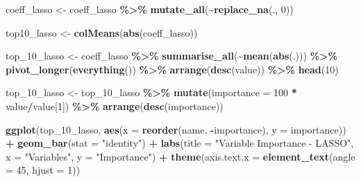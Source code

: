 \documentclass[
]{article}
\newenvironment{Shaded}{\begin{snugshade}}{\end{snugshade}}
\newcommand{\AttributeTok}[1]{\textcolor[rgb]{0.13,0.29,0.53}{#1}}
\newcommand{\DecValTok}[1]{\textcolor[rgb]{0.00,0.00,0.81}{#1}}
\newcommand{\FunctionTok}[1]{\textcolor[rgb]{0.13,0.29,0.53}{\textbf{#1}}}
\newcommand{\NormalTok}[1]{#1}
\newcommand{\OtherTok}[1]{\textcolor[rgb]{0.56,0.35,0.01}{#1}}
\newcommand{\SpecialCharTok}[1]{\textcolor[rgb]{0.81,0.36,0.00}{\textbf{#1}}}
\newcommand{\StringTok}[1]{\textcolor[rgb]{0.31,0.60,0.02}{#1}}
\begin{document}
\begin{Shaded}
\begin{Highlighting}[]
\NormalTok{coeff\_lasso }\OtherTok{\textless{}{-}}\NormalTok{ coeff\_lasso }\SpecialCharTok{\%\textgreater{}\%}
    \FunctionTok{mutate\_all}\NormalTok{(}\SpecialCharTok{\textasciitilde{}}\FunctionTok{replace\_na}\NormalTok{(., }\DecValTok{0}\NormalTok{))}

\NormalTok{top10\_lasso }\OtherTok{\textless{}{-}} \FunctionTok{colMeans}\NormalTok{(}\FunctionTok{abs}\NormalTok{(coeff\_lasso))}

\NormalTok{top\_10\_lasso }\OtherTok{\textless{}{-}}\NormalTok{ coeff\_lasso }\SpecialCharTok{\%\textgreater{}\%}
    \FunctionTok{summarise\_all}\NormalTok{(}\SpecialCharTok{\textasciitilde{}}\FunctionTok{mean}\NormalTok{(}\FunctionTok{abs}\NormalTok{(.))) }\SpecialCharTok{\%\textgreater{}\%}
    \FunctionTok{pivot\_longer}\NormalTok{(}\FunctionTok{everything}\NormalTok{()) }\SpecialCharTok{\%\textgreater{}\%}
    \FunctionTok{arrange}\NormalTok{(}\FunctionTok{desc}\NormalTok{(value)) }\SpecialCharTok{\%\textgreater{}\%}
    \FunctionTok{head}\NormalTok{(}\DecValTok{10}\NormalTok{)}

\NormalTok{top\_10\_lasso }\OtherTok{\textless{}{-}}\NormalTok{ top\_10\_lasso }\SpecialCharTok{\%\textgreater{}\%}
    \FunctionTok{mutate}\NormalTok{(}\AttributeTok{importance =} \DecValTok{100} \SpecialCharTok{*}\NormalTok{ value}\SpecialCharTok{/}\NormalTok{value[}\DecValTok{1}\NormalTok{]) }\SpecialCharTok{\%\textgreater{}\%}
    \FunctionTok{arrange}\NormalTok{(}\FunctionTok{desc}\NormalTok{(importance))}

\FunctionTok{ggplot}\NormalTok{(top\_10\_lasso, }\FunctionTok{aes}\NormalTok{(}\AttributeTok{x =} \FunctionTok{reorder}\NormalTok{(name, }\SpecialCharTok{{-}}\NormalTok{importance), }\AttributeTok{y =}\NormalTok{ importance)) }\SpecialCharTok{+}
    \FunctionTok{geom\_bar}\NormalTok{(}\AttributeTok{stat =} \StringTok{"identity"}\NormalTok{) }\SpecialCharTok{+} \FunctionTok{labs}\NormalTok{(}\AttributeTok{title =} \StringTok{"Variable Importance {-} LASSO"}\NormalTok{,}
    \AttributeTok{x =} \StringTok{"Variables"}\NormalTok{, }\AttributeTok{y =} \StringTok{"Importance"}\NormalTok{) }\SpecialCharTok{+} \FunctionTok{theme}\NormalTok{(}\AttributeTok{axis.text.x =} \FunctionTok{element\_text}\NormalTok{(}\AttributeTok{angle =} \DecValTok{45}\NormalTok{,}
    \AttributeTok{hjust =} \DecValTok{1}\NormalTok{))}
\end{Highlighting}
\end{Shaded}
\end{document}
